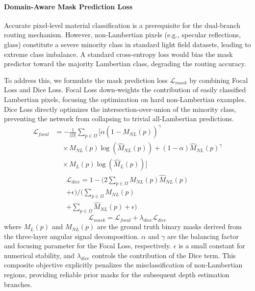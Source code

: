 \documentclass[lettersize,journal]{IEEEtran}
\begin{document}
\paragraph{Domain-Aware Mask Prediction Loss}
Accurate pixel-level material classification is a prerequisite for the dual-branch routing mechanism. However, non-Lambertian pixels (e.g., specular reflections, glass) constitute a severe minority class in standard light field datasets, leading to extreme class imbalance. A standard cross-entropy loss would bias the mask predictor toward the majority Lambertian class, degrading the routing accuracy.

To address this, we formulate the mask prediction loss $\mathcal{L}_{mask}$ by combining Focal Loss and Dice Loss. Focal Loss down-weights the contribution of easily classified Lambertian pixels, focusing the optimization on hard non-Lambertian examples. Dice Loss directly optimizes the intersection-over-union of the minority class, preventing the network from collapsing to trivial all-Lambertian predictions.
\begin{equation}
\begin{aligned}
\mathcal{L}_{focal} &= -\frac{1}{|\Omega|} \sum_{p \in \Omega} \Big[ \alpha (1-\hat{M}_{NL}(p))^\gamma \\
&\quad \times M_{NL}(p) \log(\hat{M}_{NL}(p)) + (1-\alpha) \hat{M}_{NL}(p)^\gamma \\
&\quad \times M_L(p) \log(\hat{M}_L(p)) \Big]
\end{aligned}
\end{equation}
\begin{multline}
\mathcal{L}_{dice} = 1 - \Big( 2 \sum_{p \in \Omega} M_{NL}(p)\hat{M}_{NL}(p) \\
+ \epsilon \Big) \Big/ \Big( \sum_{p \in \Omega} M_{NL}(p) \\
+ \sum_{p \in \Omega} \hat{M}_{NL}(p) + \epsilon \Big)
\end{multline}
\begin{equation}
\mathcal{L}_{mask} = \mathcal{L}_{focal} + \lambda_{dice} \mathcal{L}_{dice}
\end{equation}
where $M_L(p)$ and $M_{NL}(p)$ are the ground truth binary masks derived from the three-layer angular signal decomposition. $\alpha$ and $\gamma$ are the balancing factor and focusing parameter for the Focal Loss, respectively. $\epsilon$ is a small constant for numerical stability, and $\lambda_{dice}$ controls the contribution of the Dice term. This composite objective explicitly penalizes the misclassification of non-Lambertian regions, providing reliable prior masks for the subsequent depth estimation branches.
\end{document}
